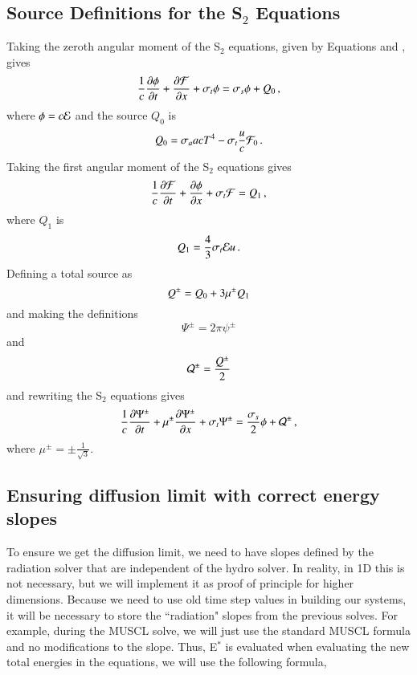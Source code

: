 \subsection{Source Definitions for the \texorpdfstring{S$_2$}{S-2} Equations}

Taking the zeroth angular moment of the S$_2$ equations, given by Equations
 and , gives
\begin{equation}
\frac{1}{c}\dydt{\phi} + \dydx{\F} + \sigma_t\phi = \sigma_s\phi + Q_0 \pec
\lequ{zerothmoment}
\end{equation}
where $\phi = c\mathcal{E}$ and the source $Q_0$ is
\begin{equation}
Q_0 = \sigma_a acT^4 - \sigma_t\frac{u}{c}\F_0 \pep
\lequ{Q0}
\end{equation}
Taking the first angular moment of the S$_2$ equations gives
\begin{equation}
\frac{1}{c}\dydt{\F} + \dydx{\phi} + \sigma_t\F = Q_1 \pec
\lequ{firstmoment}
\end{equation}
where $Q_1$ is
\begin{equation}
Q_1 = \frac{4}{3}\sigma_t\E u \pep
\lequ{Q1}
\end{equation}
Defining a total source as
\begin{equation}
Q^\pm = Q_0 + 3\mu^\pm Q_1
\lequ{Qdef}
\end{equation}
and making the definitions
\begin{equation}
  \Psi^\pm = 2\pi\psi^\pm
\end{equation}
and
\begin{equation}
  \mathcal{Q}^\pm = \frac{Q^\pm}{2}
\end{equation}
and rewriting the S$_2$ equations gives
\begin{equation}\lequ{S2Q}
  \frac{1}{c}\dydt{\Psi^\pm} + \mu^\pm\dydx{\Psi^\pm} + \sigma_t\Psi^\pm
  = \frac{\sigma_s}{2}\phi + \Q^\pm \pec
\end{equation}
where $\mu^\pm=\pm\frac{1}{\sqrt{3}}$.

\subsection{Ensuring diffusion limit with correct energy slopes}

To ensure we get the diffusion limit, we need to have slopes defined by the radiation
solver that are independent of the hydro solver.  In reality, in 1D this is not
necessary, but we will implement it as proof of principle for higher dimensions. Because we need to use
old time step values in building our systems, it will be necessary to store the
``radiation" slopes from the previous solves. For example, during the MUSCL solve, we
will just use the standard MUSCL formula and no modifications to the slope. Thus,
E$^*$ is evaluated when evaluating the new
total energies in the equations, we will use the following formula,

